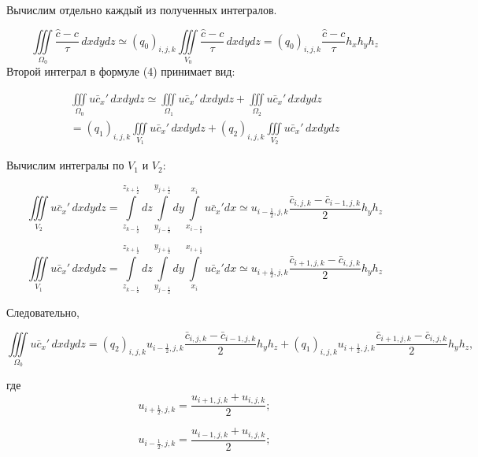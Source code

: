 \documentclass[12pt]{article}
\begin{document}
Вычислим отдельно каждый из полученных интегралов.

\begin{equation}
	\iiint\limits_{\Omega_0} \frac{\hat c - c}{\tau}\,dxdydz \simeq (q_0)_{i,j,k}\iiint\limits_{V_0} \frac{\hat c - c}{\tau}\,dxdydz = (q_0)_{i,j,k}\frac{\hat c - c}{\tau}h_xh_yh_z
\end{equation}
Второй интеграл в формуле (4) принимает вид:

\begin{multline*}
\iiint\limits_{\Omega_0} u\bar{c}_x'\,dxdydz \simeq \iiint\limits_{\Omega_1} u\bar{c}_x'\,dxdydz + \iiint\limits_{\Omega_2} u\bar{c}_x'\,dxdydz \\  
= (q_1)_{i,j,k}\iiint\limits_{V_1} u\bar{c}_x'\,dxdydz + (q_2)_{i,j,k}\iiint\limits_{V_2} u\bar{c}_x'\,dxdydz
\end{multline*}

Вычислим интегралы по $V_1$ и $V_2$:

\begin{equation*}
	\iiint\limits_{V_2} u\bar{c}_x'\,dxdydz = \int\limits_{z_{k-\frac{1}{2}}}^{z_{k+\frac{1}{2}}}dz \int\limits_{y_{j-\frac{1}{2}}}^{y_{j+\frac{1}{2}}}dy   \int\limits_{x_{i-\frac{1}{2}}}^{x_{i}}u\bar{c}_x'dx \simeq u_{{i-\frac{1}{2}},j,k}\frac{\bar{c}_{i,j,k}-\bar{c}_{i-1,j,k}}{2}h_yh_z
\end{equation*}

\begin{equation*}
\iiint\limits_{V_1} u\bar{c}_x'\,dxdydz = \int\limits_{z_{k-\frac{1}{2}}}^{z_{k+\frac{1}{2}}}dz \int\limits_{y_{j-\frac{1}{2}}}^{y_{j+\frac{1}{2}}}dy   \int\limits_{x_i}^{x_{i+\frac{1}{2}}}u\bar{c}_x'dx \simeq u_{{i+\frac{1}{2}},j,k}\frac{\bar{c}_{i+1,j,k}-\bar{c}_{i,j,k}}{2}h_yh_z
\end{equation*}

Следовательно,

\begin{equation}
	\iiint\limits_{\Omega_0} u\bar{c}_x'\,dxdydz = (q_2)_{i,j,k}u_{{i-\frac{1}{2}},j,k}\frac{\bar{c}_{i,j,k}-\bar{c}_{i-1,j,k}}{2}h_yh_z +
	(q_1)_{i,j,k}u_{{i+\frac{1}{2}},j,k}\frac{\bar{c}_{i+1,j,k}-\bar{c}_{i,j,k}}{2}h_yh_z,
\end{equation}

где 
\begin{equation*} 
	u_{{i+\frac{1}{2}},j,k} = \frac{u_{i+1,j,k}+u_{i,j,k}}{2};
\end{equation*}

\begin{equation*} 
	u_{{i-\frac{1}{2}},j,k} = \frac{u_{i-1,j,k}+u_{i,j,k}}{2};
\end{equation*}
\end{document}
